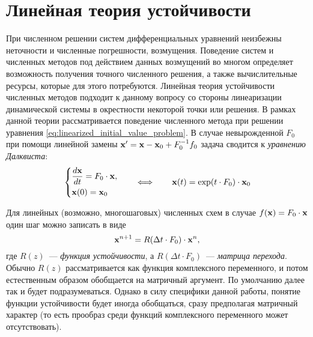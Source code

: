 \section{Линейная теория устойчивости}
\label{sec:linear_stability}

При численном решении систем дифференциальных уравнений неизбежны неточности и численные погрешности, возмущения.
Поведение систем и численных методов под действием данных возмущений во многом определяет возможность получения точного численного решения,
а также вычислительные ресурсы, которые для этого потребуются.
Линейная теория устойчивости численных методов подходит к данному вопросу со стороны линеаризации динамической системы в окрестности некоторой точки или решения.
В рамках данной теории рассматривается поведение численного метода при решении уравнения \eqref{eq:linearized_initial_value_problem}.
В случае невырожденной $ F_0 $ при помощи линейной замены $ \mathbf{x}' = \mathbf{x} - \mathbf{x}_0 + F_0^{-1} f_0 $ задача сводится к \emph{уравнению Далквиста}:
%
\begin{equation}
    \label{eq:Dahlquist_equation}
    \begin{dcases}
        \dfrac{d \mathbf{x}}{d t} = F_0 \cdot \mathbf{x}, \\
        \mathbf{x}(0) = \mathbf{x}_0
    \end{dcases}
    \qquad
    \Longleftrightarrow
    \qquad
    \mathbf{x}(t) = \exp(t \cdot F_0) \cdot \mathbf{x}_0
\end{equation}

Для линейных (возможно, многошаговых) численных схем в случае $ f(\mathbf{x}) = F_0 \cdot \mathbf{x} $ один шаг можно записать в виде
%
\begin{equation}
    \label{eq:stability_function}
    \mathbf{x}^{n+1} = R(\Delta t \cdot F_0) \cdot \mathbf{x}^n,
\end{equation}
%
где $ R(z) $~--- \emph{функция устойчивости}, а $ R(\Delta t \cdot F_0) $~--- \emph{матрица перехода}.
Обычно $ R(z) $ рассматривается как функция комплексного переменного, и потом естественным образом обобщается на матричный аргумент.
По умолчанию далее так и будет подразумеваться.
Однако в силу специфики данной работы, понятие функции устойчивости будет иногда обобщаться, сразу предполагая матричный характер
(то есть прообраз среди функций комплексного переменного может отсутствовать).

